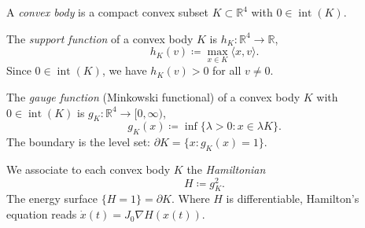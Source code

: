 \begin{definition}\label{def:convex-body}
A \emph{convex body} is a compact convex subset $K \subset \mathbb{R}^4$
with $0 \in \operatorname{int}(K)$.
\end{definition}

\begin{definition}\label{def:support-function}
The \emph{support function} of a convex body $K$ is $h_K \colon \mathbb{R}^4 \to \mathbb{R}$,
\[
  h_K(v) \coloneqq \max_{x \in K} \langle x, v \rangle.
\]
Since $0 \in \operatorname{int}(K)$, we have $h_K(v) > 0$ for all $v \neq 0$.
\end{definition}

\begin{definition}\label{def:gauge-function}
The \emph{gauge function} (Minkowski functional) of a convex body $K$ with
$0 \in \operatorname{int}(K)$ is $g_K \colon \mathbb{R}^4 \to [0,\infty)$,
\[
  g_K(x) \coloneqq \inf\{ \lambda > 0 : x \in \lambda K \}.
\]
The boundary is the level set: $\partial K = \{x : g_K(x) = 1\}$.
\end{definition}

\begin{definition}[Hamiltonian]\label{def:hamiltonian}
We associate to each convex body $K$ the \emph{Hamiltonian}
\[
  H \coloneqq g_K^2.
\]
The energy surface $\{H = 1\} = \partial K$.
Where $H$ is differentiable, Hamilton's equation reads
$\dot{x}(t) = J_0 \nabla H(x(t))$.
\end{definition}

